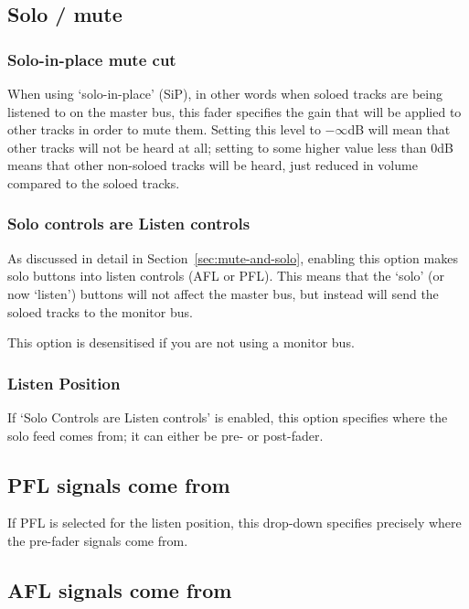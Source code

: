 \documentclass[10pt,a4paper]{book}
\begin{document}
\subsection{Solo / mute}

\subsubsection{Solo-in-place mute cut}

When using `solo-in-place' (SiP), in other words when soloed tracks
are being listened to on the master bus, this fader specifies the gain
that will be applied to other tracks in order to mute them.  Setting
this level to $-\infty$dB will mean that other tracks will not be
heard at all; setting to some higher value less than 0dB means that
other non-soloed tracks will be heard, just reduced in volume compared
to the soloed tracks.

\subsubsection{Solo controls are Listen controls}

As discussed in detail in Section~\ref{sec:mute-and-solo}, enabling
this option makes solo buttons into listen controls (AFL or PFL).
This means that the `solo' (or now `listen') buttons will not affect
the master bus, but instead will send the soloed tracks to the monitor
bus.

This option is desensitised if you are not using a monitor bus.

\subsubsection{Listen Position}

If `Solo Controls are Listen controls' is enabled, this option
specifies where the solo feed comes from; it can either be pre- or
post-fader.

\subsection{PFL signals come from}

If PFL is selected for the listen position, this drop-down specifies
precisely where the pre-fader signals come from.

\subsection{AFL signals come from}
\end{document}
